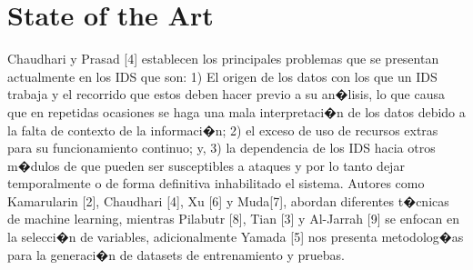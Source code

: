 \documentclass{article}
\begin{document}
\section{State of the Art} %
Chaudhari y Prasad [4] establecen los principales problemas que se presentan actualmente en los IDS que son: 1) El origen de los datos con los que un IDS trabaja y el recorrido que estos deben hacer previo a su an�lisis, lo que causa que en repetidas ocasiones se haga una mala interpretaci�n de los datos debido a la falta de contexto de la informaci�n; 2) el exceso de uso de recursos extras para su funcionamiento continuo; y, 3) la dependencia de los IDS hacia otros m�dulos de que pueden ser susceptibles a ataques y por lo tanto dejar temporalmente o de forma definitiva inhabilitado el sistema.
Autores como Kamarularin [2], Chaudhari [4], Xu [6] y Muda[7], abordan diferentes t�cnicas de machine learning, mientras Pilabutr [8], Tian [3] y Al-Jarrah [9] se enfocan en la selecci�n de variables, adicionalmente Yamada [5] nos presenta metodolog�as para la generaci�n de datasets de entrenamiento y pruebas.
\end{document}
